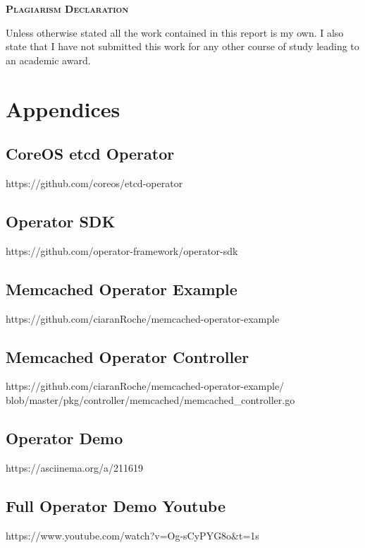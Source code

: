 \documentclass{article}
\begin{document}
\onehalfspacing
\hypersetup{pageanchor=false}

\hypersetup{pageanchor=true}
\clearpage
\begin{center}
\begin{minipage}{\textwidth}
  
  {\scshape\large \textbf{Plagiarism Declaration}\par}
  \vspace{1cm}
  Unless otherwise stated all the work contained in this report is my own.  I also state that I have not submitted this work for any other course of study leading to an academic award.
\end{minipage}
\end{center}
\vfill %
\clearpage

\tableofcontents

\newpage


\newpage


\newpage


\newpage


\newpage


\newpage
\appendix
\section*{Appendices}
\renewcommand{\thesubsection}{\Alph{subsection}}

\subsection{CoreOS etcd Operator} 
\label{appendix:coreosetcd}
https://github.com/coreos/etcd-operator

\subsection{Operator SDK} 
\label{appendix:opsdk}
https://github.com/operator-framework/operator-sdk

\subsection{Memcached Operator Example} 
\label{appendix:memop}
https://github.com/ciaranRoche/memcached-operator-example

\subsection{Memcached Operator Controller} 
\label{appendix:memopcon}
https://github.com/ciaranRoche/memcached-operator-example/
\\blob/master/pkg/controller/memcached/memcached\_controller.go

\subsection{Operator Demo} 
\label{appendix:opdemo}
https://asciinema.org/a/211619

\subsection{Full Operator Demo Youtube} 
\label{appendix:opdemoyou}
https://www.youtube.com/watch?v=Og-sCyPYG8o\&t=1s
\newpage

\end{document}
